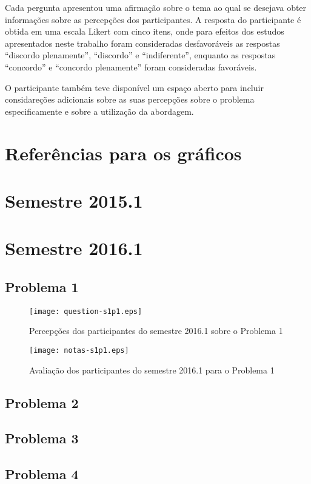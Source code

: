 Cada pergunta apresentou uma afirmação sobre o tema ao qual se desejava obter informações sobre as
percepções dos participantes.
A resposta do participante é obtida em uma escala Likert com cinco itens, onde para efeitos dos estudos
apresentados neste trabalho foram consideradas desfavoráveis
as respostas ``discordo plenamente'', ``discordo'' e ``indiferente'', enquanto as
respostas ``concordo'' e ``concordo plenamente'' foram consideradas favoráveis.

O participante também teve disponível um espaço aberto para incluir considareções adicionais sobre
as suas percepções sobre o problema especificamente e sobre a utilização da abordagem.

\section{Referências para os gráficos}


\section{Semestre 2015.1}
\section{Semestre 2016.1}
\subsection{Problema 1}
\begin{figure}[!htb]
\centering
\texttt{[image: question-s1p1.eps]}
\caption{Percepções dos participantes do semestre 2016.1 sobre o Problema 1}
\label{Rotulo}
\end{figure}
\begin{figure}[!htb]
\centering
\texttt{[image: notas-s1p1.eps]}
\caption{Avaliação dos participantes do semestre 2016.1 para o Problema 1}
\label{Rotulo}
\end{figure}
\subsection{Problema 2}
\subsection{Problema 3}
\subsection{Problema 4}
